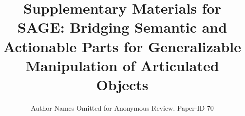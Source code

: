 \documentclass[conference]{IEEEtran}
\begin{document}
\title{\LARGE Supplementary Materials for \\
\textbf{SAGE}: Bridging \textbf{{S}}emantic and \textbf{{A}}ctionable Parts for
\textbf{{Ge}}neralizable Manipulation of Articulated Objects}

\author{Author Names Omitted for Anonymous Review. Paper-ID 70}





% 
\end{document}

